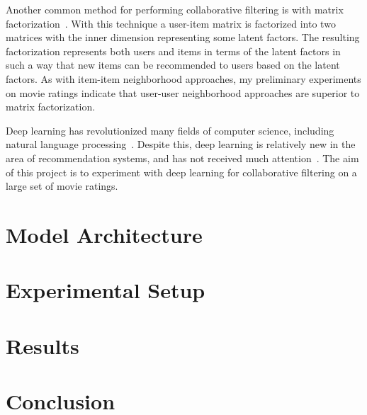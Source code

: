\documentclass{sig-alternate-05-2015}
\begin{document}
Another common method for performing collaborative filtering is with matrix
factorization~\cite{matrix-factorization}.
With this technique a user-item matrix is factorized into two matrices with the
inner dimension representing some latent factors.
The resulting factorization represents both users and items in terms of the
latent factors in such a way that new items can be recommended to users based
on the latent factors.
As with item-item neighborhood approaches, my preliminary experiments on movie
ratings indicate that user-user neighborhood approaches are superior to matrix
factorization.

Deep learning has revolutionized many fields of computer science, including
natural language processing~\cite{deep-survey}.
Despite this, deep learning is relatively new in the area of recommendation
systems, and has not received much attention~\cite{dl-recsys-survey}.
The aim of this project is to experiment with deep learning for collaborative
filtering on a large set of movie ratings.

\section{Model Architecture}

\section{Experimental Setup}

\section{Results}

\section{Conclusion}



\end{document}

